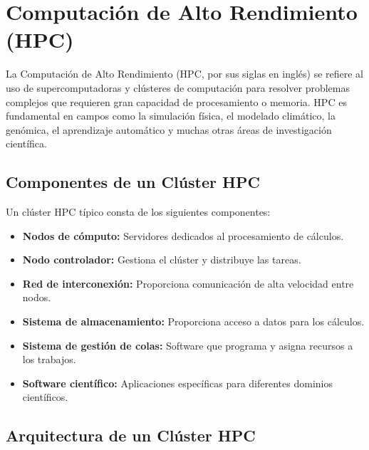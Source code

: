 \documentclass[12pt,a4paper]{report}
\begin{document}
\section{Computación de Alto Rendimiento (HPC)}

\begin{tcolorbox}[
  colback=cientigo-blue!5,
  colframe=cientigo-blue,
  arc=2mm,
  boxrule=0.5pt
]
La Computación de Alto Rendimiento (HPC, por sus siglas en inglés) se refiere al uso de supercomputadoras y clústeres de computación para resolver problemas complejos que requieren gran capacidad de procesamiento o memoria. HPC es fundamental en campos como la simulación física, el modelado climático, la genómica, el aprendizaje automático y muchas otras áreas de investigación científica.
\end{tcolorbox}

\subsection{Componentes de un Clúster HPC}

Un clúster HPC típico consta de los siguientes componentes:

\begin{itemize}
    \item[\textcolor{cientigo-orange}{\faServer}] \textbf{Nodos de cómputo:} Servidores dedicados al procesamiento de cálculos.
    \item[\textcolor{cientigo-orange}{\faServer}] \textbf{Nodo controlador:} Gestiona el clúster y distribuye las tareas.
    \item[\textcolor{cientigo-orange}{\faNetworkWired}] \textbf{Red de interconexión:} Proporciona comunicación de alta velocidad entre nodos.
    \item[\textcolor{cientigo-orange}{\faDatabase}] \textbf{Sistema de almacenamiento:} Proporciona acceso a datos para los cálculos.
    \item[\textcolor{cientigo-orange}{\faListAlt}] \textbf{Sistema de gestión de colas:} Software que programa y asigna recursos a los trabajos.
    \item[\textcolor{cientigo-orange}{\faCode}] \textbf{Software científico:} Aplicaciones específicas para diferentes dominios científicos.
\end{itemize}

\subsection{Arquitectura de un Clúster HPC}
\end{document}
